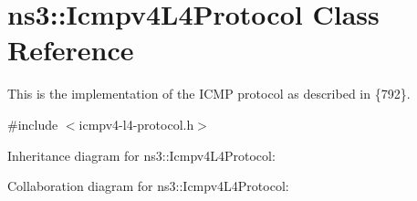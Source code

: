 \hypertarget{classns3_1_1Icmpv4L4Protocol}{}\section{ns3\+:\+:Icmpv4\+L4\+Protocol Class Reference}
\label{classns3_1_1Icmpv4L4Protocol}


This is the implementation of the I\+C\+MP protocol as described in \{792\}.  




{\ttfamily \#include $<$icmpv4-\/l4-\/protocol.\+h$>$}



Inheritance diagram for ns3\+:\+:Icmpv4\+L4\+Protocol\+:


Collaboration diagram for ns3\+:\+:Icmpv4\+L4\+Protocol\+:
